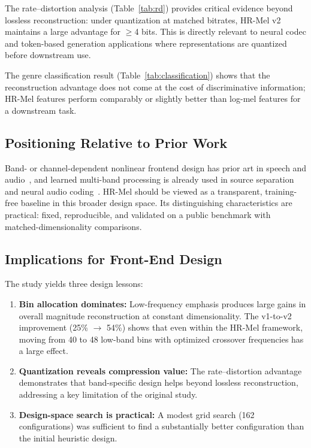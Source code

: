 \documentclass[twocolumn]{article}
\begin{document}
The rate--distortion analysis (Table~\ref{tab:rd}) provides critical evidence beyond lossless reconstruction: under quantization at matched bitrates, HR-Mel v2 maintains a large advantage for $\geq$4 bits. This is directly relevant to neural codec and token-based generation applications where representations are quantized before downstream use.

The genre classification result (Table~\ref{tab:classification}) shows that the reconstruction advantage does not come at the cost of discriminative information; HR-Mel features perform comparably or slightly better than log-mel features for a downstream task.

\subsection{Positioning Relative to Prior Work}

Band- or channel-dependent nonlinear frontend design has prior art in speech and audio~\cite{nasersharif2007mel,pncc2016,pcen2018,leaf2021}, and learned multi-band processing is already used in source separation and neural audio coding~\cite{luo2023bandsplit,bscodec2025,muffin2025}. HR-Mel should be viewed as a transparent, training-free baseline in this broader design space. Its distinguishing characteristics are practical: fixed, reproducible, and validated on a public benchmark with matched-dimensionality comparisons.

\subsection{Implications for Front-End Design}

The study yields three design lessons:
\begin{enumerate}
\item \textbf{Bin allocation dominates:} Low-frequency emphasis produces large gains in overall magnitude reconstruction at constant dimensionality. The v1-to-v2 improvement (25\% $\to$ 54\%) shows that even within the HR-Mel framework, moving from 40 to 48 low-band bins with optimized crossover frequencies has a large effect.
\item \textbf{Quantization reveals compression value:} The rate--distortion advantage demonstrates that band-specific design helps beyond lossless reconstruction, addressing a key limitation of the original study.
\item \textbf{Design-space search is practical:} A modest grid search (162 configurations) was sufficient to find a substantially better configuration than the initial heuristic design.
\end{enumerate}
\end{document}
